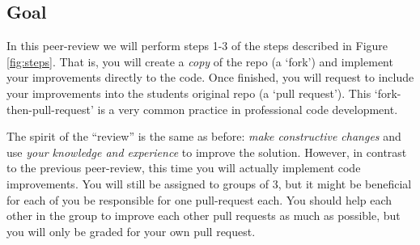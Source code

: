 \documentclass[a4paper]{article}
\begin{document}
\subsection{Goal}
In this peer-review we will perform steps 1-3 of the steps described in Figure \ref{fig:steps}.
That is, you will create a \emph{copy} of the repo (a `fork') and implement your improvements directly to the code. Once finished, you will request to include your improvements into the students original repo (a `pull request'). This `fork-then-pull-request' is a very common practice in professional code development. 

The spirit of the ``review'' is the same as before: \emph{make constructive changes} and use \emph{your knowledge and experience} to improve the solution. However, in contrast to the previous peer-review, this time you will actually implement code improvements. You will still be assigned to groups of 3, but it might be beneficial for each of you be responsible for one pull-request each. You should help each other in the group to improve each other pull requests as much as possible, but you will only be graded for your own pull request. 
\end{document}
